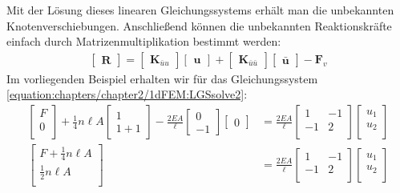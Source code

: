 \documentclass[letterpaper,10pt,german]{jupyterBook}
\begin{document}
\sphinxAtStartPar
Mit der Lösung dieses linearen Gleichungssystems erhält man die unbekannten Knotenverschiebungen. Anschließend können die unbekannten Reaktionskräfte einfach durch Matrizenmultiplikation bestimmt werden:
\begin{equation}\label{equation:chapters/chapter2/1dFEM:LGSsolve3}
\begin{split}\begin{bmatrix} \bm{R} \end{bmatrix} = 
\begin{bmatrix}
\bm{K}_{\bar{u}u}
\end{bmatrix}
\begin{bmatrix}
\bm{u}
\end{bmatrix} + \begin{bmatrix}
\bm{K}_{\bar{u}\bar{u}} 
\end{bmatrix} \begin{bmatrix}
\bar{\bm{u}}
\end{bmatrix}- \bm{F}_v\end{split}
\end{equation}
\sphinxAtStartPar
Im vorliegenden Beispiel erhalten wir für das Gleichungssystem \eqref{equation:chapters/chapter2/1dFEM:LGSsolve2}:
\label{equation:chapters/chapter2/1dFEM:f3e6769c-2de7-45f1-9e4c-35f34e9b017a}\begin{align}
\begin{bmatrix}
F \\
0 \\
\end{bmatrix} + \frac{1}{4}n\ell A \begin{bmatrix}
1 \\
1+1
\end{bmatrix} - \frac{2EA}{\ell}\begin{bmatrix}
 0\\
-1
\end{bmatrix} \begin{bmatrix}
0
\end{bmatrix} & = \frac{2EA}{\ell}\begin{bmatrix}
1 & -1\\
-1 & 2 \\
\end{bmatrix} \begin{bmatrix}
u_1 \\
u_2\\
\end{bmatrix} \\
\begin{bmatrix}
F +\frac{1}{4}n\ell A \\
\frac{1}{2}n\ell A \\
\end{bmatrix} & =
\frac{2EA}{\ell}\begin{bmatrix}
1 & -1\\
-1 & 2 \\
\end{bmatrix} \begin{bmatrix}
u_1 \\
u_2\\
\end{bmatrix} 
\end{align}
\end{document}
